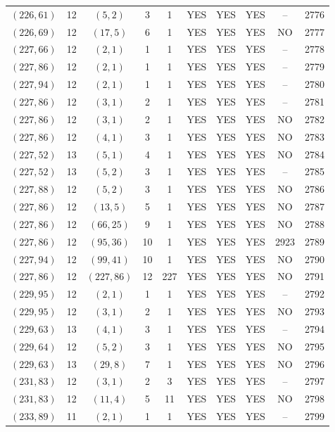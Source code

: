 \begin{longtable}{|c|c|c|c|c|c|c|c|c|c|}
$(226, 61)$ & 12 & $(5, 2)$ & 3 & 1 & YES & YES & YES & -- & 2776\\
$(226, 69)$ & 12 & $(17, 5)$ & 6 & 1 & YES & YES & YES & NO & 2777\\
$(227, 66)$ & 12 & $(2, 1)$ & 1 & 1 & YES & YES & YES & -- & 2778\\
$(227, 86)$ & 12 & $(2, 1)$ & 1 & 1 & YES & YES & YES & -- & 2779\\
$(227, 94)$ & 12 & $(2, 1)$ & 1 & 1 & YES & YES & YES & -- & 2780\\
$(227, 86)$ & 12 & $(3, 1)$ & 2 & 1 & YES & YES & YES & -- & 2781\\
$(227, 86)$ & 12 & $(3, 1)$ & 2 & 1 & YES & YES & YES & NO & 2782\\
$(227, 86)$ & 12 & $(4, 1)$ & 3 & 1 & YES & YES & YES & NO & 2783\\
$(227, 52)$ & 13 & $(5, 1)$ & 4 & 1 & YES & YES & YES & NO & 2784\\
$(227, 52)$ & 13 & $(5, 2)$ & 3 & 1 & YES & YES & YES & -- & 2785\\
$(227, 88)$ & 12 & $(5, 2)$ & 3 & 1 & YES & YES & YES & NO & 2786\\
$(227, 86)$ & 12 & $(13, 5)$ & 5 & 1 & YES & YES & YES & NO & 2787\\
$(227, 86)$ & 12 & $(66, 25)$ & 9 & 1 & YES & YES & YES & NO & 2788\\
$(227, 86)$ & 12 & $(95, 36)$ & 10 & 1 & YES & YES & YES & 2923 & 2789\\
$(227, 94)$ & 12 & $(99, 41)$ & 10 & 1 & YES & YES & YES & NO & 2790\\
$(227, 86)$ & 12 & $(227, 86)$ & 12 & 227 & YES & YES & YES & NO & 2791\\
$(229, 95)$ & 12 & $(2, 1)$ & 1 & 1 & YES & YES & YES & -- & 2792\\
$(229, 95)$ & 12 & $(3, 1)$ & 2 & 1 & YES & YES & YES & NO & 2793\\
$(229, 63)$ & 13 & $(4, 1)$ & 3 & 1 & YES & YES & YES & -- & 2794\\
$(229, 64)$ & 12 & $(5, 2)$ & 3 & 1 & YES & YES & YES & NO & 2795\\
$(229, 63)$ & 13 & $(29, 8)$ & 7 & 1 & YES & YES & YES & NO & 2796\\
$(231, 83)$ & 12 & $(3, 1)$ & 2 & 3 & YES & YES & YES & -- & 2797\\
$(231, 83)$ & 12 & $(11, 4)$ & 5 & 11 & YES & YES & YES & NO & 2798\\
$(233, 89)$ & 11 & $(2, 1)$ & 1 & 1 & YES & YES & YES & -- & 2799\\

\end{longtable}
